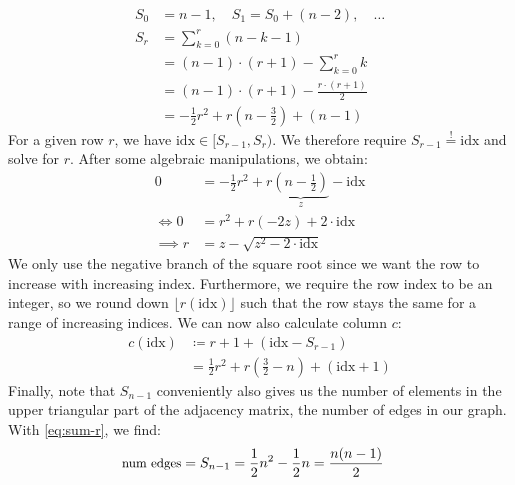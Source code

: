\begin{align}
    S_0 &= n-1, \quad S_1 = S_0 + (n-2), \quad\ldots\\
    S_r &= \sum_{k=0}^{r} (n-k-1)\\
    &= (n-1) \cdot (r+1) - \sum_{k=0}^{r} k\\
    &= (n-1) \cdot (r+1) - \frac{r \cdot (r+1)}{2}\\
    &= -\frac{1}{2}r^2 + r \left(n- \frac{3}{2}\right) + (n-1)
    \label{eq:sum-r}
\end{align}
For a given row $r$, we have $\text{idx} \in [S_{r-1}, S_r)$. We therefore require $S_{r-1} \overset{!}{=} \text{idx}$ and solve for $r$. After some algebraic manipulations, we obtain:
\begin{align}
    0 &= -\frac{1}{2} r^2 + r \underbrace{\left(n - \frac{1}{2}\right)}_z - \text{idx}\\
    \iff 0 &= r^2 + r (-2z) + 2 \cdot \text{idx}\\
    \implies r &= z - \sqrt{z^2 - 2\cdot \text{idx}}
    \label{eq:row-index}
\end{align}
We only use the negative branch of the square root since we want the row to increase with increasing index. Furthermore, we require the row index to be an integer, so we round down $\lfloor r(\text{idx}) \rfloor$ such that the row stays the same for a range of increasing indices. We can now also calculate column $c$:
\begin{align}
    c(\text{idx}) &\coloneqq r + 1 + (\text{idx} - S_{r-1})\\
    &= \frac{1}{2} r^2 + r \left(\frac{3}{2} - n\right) + (\text{idx} + 1)
\end{align}
Finally, note that $S_{n-1}$ conveniently also gives us the number of elements in the upper triangular part of the adjacency matrix, \ie the number of edges in our graph. With \eqref{eq:sum-r}, we find:
\begin{align}
    \small{\text{num edges}}
    &= S_{n-1} = \frac{1}{2} n^2 - \frac{1}{2} n
    = \frac{n(n-1)}{2}
    \label{eq:num-edges}
\end{align}
